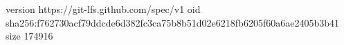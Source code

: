 version https://git-lfs.github.com/spec/v1
oid sha256:f762730acf79ddcde6d382fc3ca75b8b51d02e6218fb6205f60a6ae2405b3b41
size 174916
